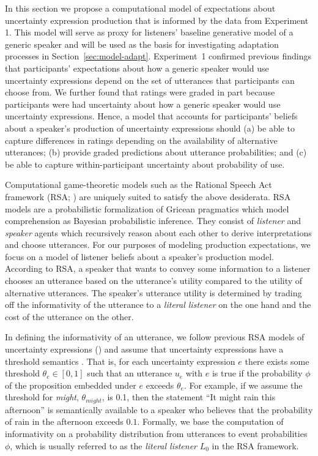 \documentclass[man, floatsintext]{apa6}
\newcommand{\sectionref}[1]{Section~\ref{#1}}
\begin{document}
In this section we propose a computational model of expectations about uncertainty expression production that is informed by the data from Experiment 1. This model will serve as proxy for listeners' baseline generative model of a generic speaker and will be used as the basis for investigating adaptation processes in \sectionref{sec:model-adapt}. Experiment~1 confirmed previous findings that participants' expectations 
about how a generic speaker would use uncertainty expressions 
depend on the set of utterances that participants can choose from.
We further found that ratings were graded in part because participants were had uncertainty about how a generic speaker would use uncertainty expressions. 
Hence, a model that accounts for participants' beliefs about a speaker's production of uncertainty expressions
 should  (a) be able to capture differences in ratings depending on the availability of alternative utterances;
(b) provide graded predictions about utterance probabilities; 
and (c) be able to capture within-participant uncertainty about probability of use.

Computational game-theoretic models such as the Rational Speech Act 
framework (RSA; \cite{Goodman2016})  are uniquely suited to satisfy the above desiderata.
RSA models are a probabilistic formalization of Gricean pragmatics which model comprehension as Bayesian probabilistic inference. 
They consist of \textit{listener} and \textit{speaker} agents which recursively reason about each other to derive interpretations and choose utterances. 
For our purposes of modeling production expectations, we focus on a model of listener beliefs about a speaker's production model.
  According to  RSA, a {speaker} that wants to
 convey some information to a {listener}
chooses an utterance based on the utterance's utility compared to the utility of alternative utterances. 
The {speaker}'s utterance utility is determined by trading off the informativity of the utterance to a \textit{literal listener} on the one hand and the cost of the utterance on the other.

In defining the informativity of an utterance, we follow previous RSA models of uncertainty expressions (\cite{Herbstritt2019}) 
and assume that uncertainty expressions have a threshold semantics \parencite{Swanson2006,Yalcin2010,Lassiter2016}. That is, for each uncertainty expression $e$ there exists some threshold $\theta_e \in [0,1]$ 
such that an utterance $u_e$ with $e$ is true if the probability $\phi$ 
of the proposition embedded under $e$ exceeds $\theta_e$. 
For example, if we assume the threshold for \textit{might}, $\theta_{might}$, is 0.1, then the statement 
``It might rain this afternoon'' is semantically available to a {speaker} who believes that the probability of rain in the afternoon exceeds $0.1$.
Formally, we base the computation of informativity on a probability distribution from utterances to event probabilities $\phi$, 
which is usually referred to as the \textit{literal listener} $L_0$ in the RSA framework. 
\end{document}
